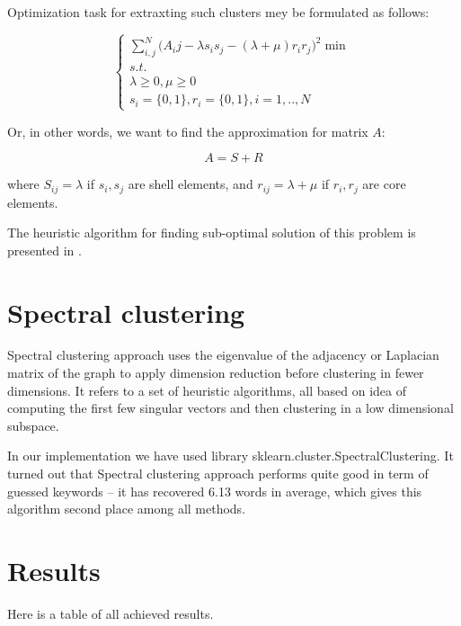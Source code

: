 \documentclass[a4paper]{article}
\begin{document}
Optimization task for extraxting such clusters mey be formulated as follows:

$$\begin{cases}
\sum_{i,j}^N \Big( A_ij - \lambda s_is_j - (\lambda + \mu)r_ir_j \Big)^2 \min\\

s.t.\\

\lambda \geq 0, \mu \geq 0\\

s_i = \{0,1\}, r_i = \{0,1\}, i=1,..,N
\end{cases}$$

Or, in other words, we want to find the approximation for matrix $A$:

$$A = S + R$$

where $S_{ij} = \lambda$ if $s_i, s_j$ are shell elements, and $r_{ij} = \lambda + \mu$ if $r_i, r_j$ are core elements.

The heuristic algorithm for finding sub-optimal solution of this problem is presented in \cite{rodin2017supercluster}.


\section*{Spectral clustering}

Spectral clustering approach uses the eigenvalue of the adjacency or Laplacian matrix of the graph to apply dimension reduction before clustering in fewer dimensions. It refers to a set of heuristic algorithms, all based on idea of computing the first few singular vectors and then clustering in a low dimensional subspace.

In our implementation we have used library sklearn.cluster.SpectralClustering. It turned out that Spectral clustering approach performs quite good in term of guessed keywords -- it has recovered 6.13 words in average, which gives this algorithm second place among all methods.

\newpage

\section*{Results}

Here is a table of all achieved results.
\end{document}
